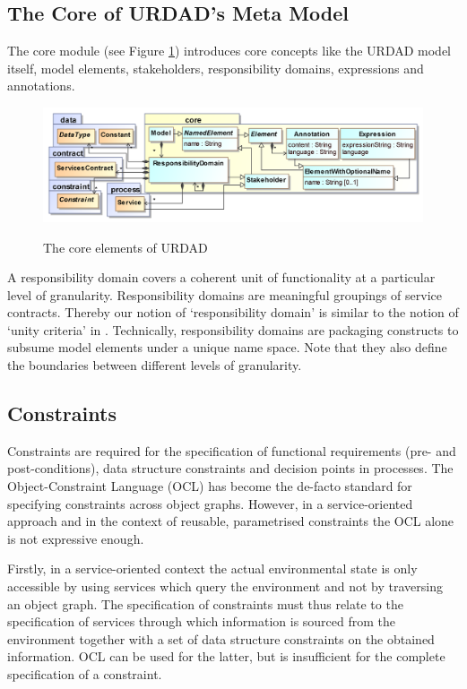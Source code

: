 \subsection{The Core of URDAD's Meta Model}

The core module (see Figure \ref{fig:coreModule}) introduces core concepts like the URDAD model itself, model elements, stakeholders, responsibility domains, expressions and annotations.
\begin{figure}[thb]
  \centering
  \includegraphics{core}\\   
  \caption{The core elements of URDAD}
  \label{fig:coreModule}
\end{figure}


A responsibility domain covers a coherent unit of functionality at a particular level of granularity. Responsibility domains are meaningful groupings of service contracts. Thereby our notion of `responsibility domain' is similar to the notion of `unity criteria' in \cite{gonzalez_unity_2009}. Technically, responsibility domains are packaging constructs to subsume model elements under a unique name space. Note that they also define the boundaries between different levels of granularity. 

\subsection{Constraints}

Constraints are required for the specification of functional requirements (pre- and post-conditions), data structure constraints and decision points in processes. The Object-Constraint Language (OCL) has become the de-facto standard for specifying constraints across object gra\-phs. However, in a service-oriented approach and in the context of reusable, parametrised constraints the OCL alone is not expressive enough. 

Firstly, in a service-oriented context the actual environmental state is only accessible by using services which query the environment and not by traversing an object graph. The specification of constraints must thus relate to the specification of services through which information is sourced from the environment together with a set of data structure constraints on the obtained information. OCL can be used for the latter, but is insufficient for the complete specification of a constraint.


